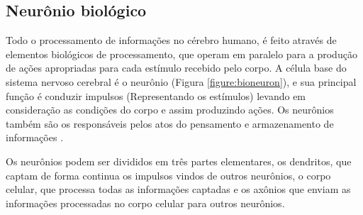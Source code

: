 

\subsection{Neurônio biológico}


\par Todo o processamento de informações no cérebro humano, é feito através de elementos biológicos de processamento, que operam em paralelo para a produção de ações apropriadas para cada estímulo recebido pelo corpo. A célula base do sistema nervoso cerebral é o neurônio (Figura \ref{figure:bioneuron}), e sua principal função é conduzir impulsos (Representando os estímulos) levando em consideração as condições do corpo e assim produzindo ações. Os neurônios também são os responsáveis pelos atos do pensamento e armazenamento de informações \cite{livroNunes2016}.

\par Os neurônios podem ser divididos em três partes elementares, os dendritos, que captam de forma continua os impulsos vindos de outros neurônios, o corpo celular, que processa todas as informações captadas e os axônios que enviam as informações processadas no corpo celular para outros neurônios.

